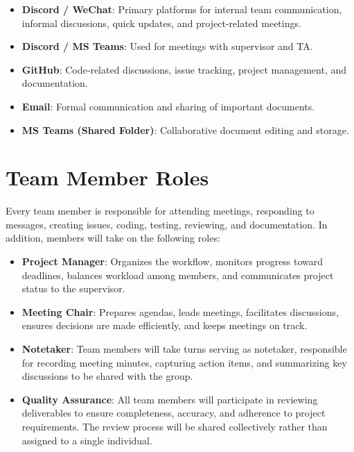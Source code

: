 \documentclass{article}
\begin{document}
\begin{itemize}
  \item \textbf{Discord / WeChat}: Primary platforms for internal team communication, informal discussions, quick updates, and project-related meetings.
  \item \textbf{Discord / MS Teams}: Used for meetings with supervisor and TA.
  \item \textbf{GitHub}: Code-related discussions, issue tracking, project management, and documentation.
  \item \textbf{Email}: Formal communication and sharing of important documents.
  \item \textbf{MS Teams (Shared Folder)}: Collaborative document editing and storage.
\end{itemize}


\section{Team Member Roles}


Every team member is responsible for attending meetings, responding to messages, creating issues, coding, testing, 
reviewing, and documentation. In addition, members will take on the following roles:

\begin{itemize}
  \item \textbf{Project Manager}: Organizes the workflow, monitors progress toward deadlines, balances workload among members, and communicates project status to the supervisor.
  
  \item \textbf{Meeting Chair}: Prepares agendas, leads meetings, facilitates discussions, ensures decisions are made efficiently, and keeps meetings on track.
  
  \item \textbf{Notetaker}: Team members will take turns serving as notetaker, responsible for recording meeting minutes, capturing action items, and summarizing key discussions to be shared with the group.
  
  \item \textbf{Quality Assurance}: All team members will participate in reviewing deliverables to ensure completeness, accuracy, and adherence to project requirements. The review process will be shared collectively rather than assigned to a single individual.
\end{itemize}
\end{document}
